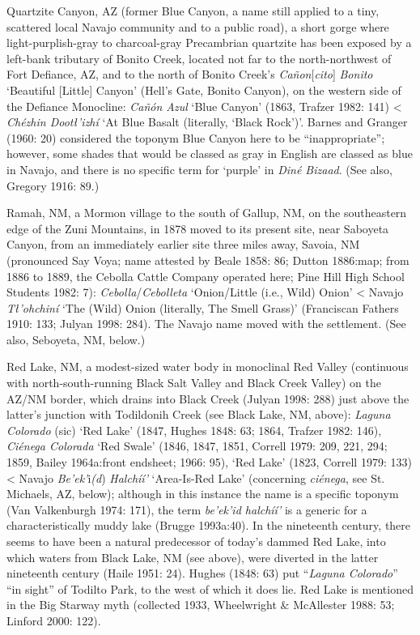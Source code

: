 Quartzite Canyon, AZ (former Blue Canyon, a name still applied to a tiny, scattered local Navajo community and to a public road), a short gorge where light-purplish-gray to charcoal-gray Precambrian quartzite has been exposed by a left-bank tributary of Bonito Creek, located not far to the north-northwest of Fort Defiance, AZ, and to the north of Bonito Creek’s \textit{Cañon}[\textit{cito}]\textit{ Bonito} ‘Beautiful [Little] Canyon’ (Hell’s Gate, Bonito Canyon), on the western side of the Defiance Monocline:  \textit{Cañón Azul} ‘Blue Canyon’ (1863, Trafzer 1982: 141) {\textless} \textit{Chézhin Dootł’izhí }‘At Blue Basalt (literally, ‘Black Rock’)'.  Barnes and Granger (1960: 20) considered the toponym Blue Canyon here to be “inappropriate”; however, some shades that would be classed as gray in English are classed as blue in Navajo, and there is no specific term for ‘purple’ in \textit{Diné Bizaad}.  (See also, Gregory 1916: 89.)

Ramah, NM, a Mormon village to the south of Gallup, NM, on the southeastern edge of the Zuni Mountains, in 1878 moved to its present site, near Saboyeta Canyon, from an immediately earlier site three miles away, Savoia, NM (pronounced Say Voya; name attested by Beale 1858: 86; Dutton 1886:map; from 1886 to 1889, the Cebolla Cattle Company operated here; Pine Hill High School Students 1982: 7):  \textit{Cebolla}/\textit{Cebolleta} ‘Onion/Little (i.e., Wild) Onion’ {\textless} Navajo \textit{Tł{}'ohchiní} ‘The (Wild) Onion (literally, The Smell Grass)’ (Franciscan Fathers 1910: 133; Julyan 1998: 284).  The Navajo name moved with the settlement.  (See also, Seboyeta, NM, below.)

Red Lake, NM, a modest-sized water body in monoclinal Red Valley (continuous with north-south-running Black Salt Valley and Black Creek Valley) on the AZ/NM border, which drains into Black Creek (Julyan 1998: 288) just above the latter’s junction with Todildonih Creek (see Black Lake, NM, above):  \textit{Laguna Colorado} (sic) ‘Red Lake’ (1847, Hughes 1848: 63; 1864, Trafzer 1982: 146), \textit{Ciénega Colorada }‘Red Swale’ (1846, 1847, 1851, Correll 1979: 209, 221, 294; 1859, Bailey 1964a:front endsheet; 1966: 95), ‘Red Lake’ (1823, Correll 1979: 133) {\textless} Navajo \textit{Be'ek'}i\textit{(d})\textit{ Halchíí'} ‘Area-Is-Red Lake’ (concerning \textit{ciénega}, see St. Michaels, AZ, below); although in this instance the name is a specific toponym (Van Valkenburgh 1974: 171), the term \textit{be'ek'id halchíí'} is a generic for a characteristically muddy lake (Brugge 1993a:40).  In the nineteenth century, there seems to have been a natural predecessor of today’s dammed Red Lake, into which waters from Black Lake, NM (see above), were diverted in the latter nineteenth century (Haile 1951: 24).  Hughes (1848: 63) put “\textit{Laguna Colorado}” “in sight” of Todilto Park, to the west of which it does lie.  Red Lake is mentioned in the Big Starway myth (collected 1933, Wheelwright \& McAllester 1988: 53; Linford 2000: 122).

